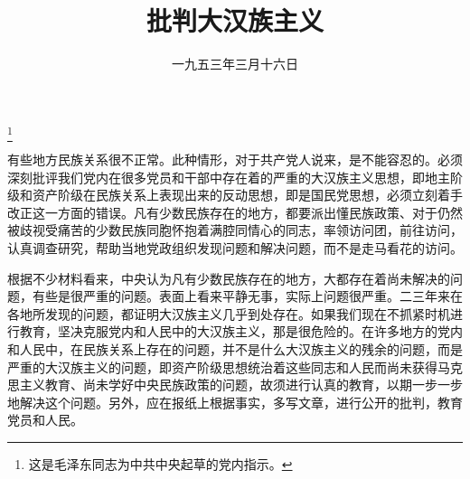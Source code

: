 
\title{批判大汉族主义}
\date{一九五三年三月十六日}
\thanks{这是毛泽东同志为中共中央起草的党内指示。}
\maketitle


有些地方民族关系很不正常。此种情形，对于共产党人说来，是不能容忍的。必须深刻批评我们党内在很多党员和干部中存在着的严重的大汉族主义思想，即地主阶级和资产阶级在民族关系上表现出来的反动思想，即是国民党思想，必须立刻着手改正这一方面的错误。凡有少数民族存在的地方，都要派出懂民族政策、对于仍然被歧视受痛苦的少数民族同胞怀抱着满腔同情心的同志，率领访问团，前往访问，认真调查研究，帮助当地党政组织发现问题和解决问题，而不是走马看花的访问。

根据不少材料看来，中央认为凡有少数民族存在的地方，大都存在着尚未解决的问题，有些是很严重的问题。表面上看来平静无事，实际上问题很严重。二三年来在各地所发现的问题，都证明大汉族主义几乎到处存在。如果我们现在不抓紧时机进行教育，坚决克服党内和人民中的大汉族主义，那是很危险的。在许多地方的党内和人民中，在民族关系上存在的问题，并不是什么大汉族主义的残余的问题，而是严重的大汉族主义的问题，即资产阶级思想统治着这些同志和人民而尚未获得马克思主义教育、尚未学好中央民族政策的问题，故须进行认真的教育，以期一步一步地解决这个问题。另外，应在报纸上根据事实，多写文章，进行公开的批判，教育党员和人民。
